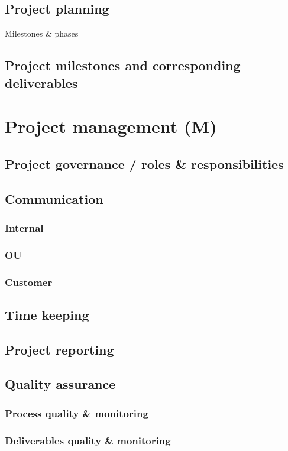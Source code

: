 \documentclass[a4paper,12pt,abstracton,titlepage]{scrartcl}
\begin{document}
\subsection{Project planning}
Milestones \& phases

\subsection{Project milestones and corresponding deliverables }
\lipsum[1]

\section{Project management (M)}
\label{sec:project-management}
\subsection{Project governance / roles \& responsibilities}
\lipsum[1]
\subsection{Communication}
\lipsum[1]
\subsubsection{Internal}
\lipsum[1]
\subsubsection{OU}
\lipsum[1]
\subsubsection{Customer}
\lipsum[1]
\subsection{Time keeping}
\lipsum[1]
\subsection{Project reporting}
\lipsum[1]
\subsection{Quality assurance}
\lipsum[1]
\subsubsection{Process quality \& monitoring}
\lipsum[1]
\subsubsection{Deliverables quality \& monitoring}
\lipsum[1]
\end{document}
